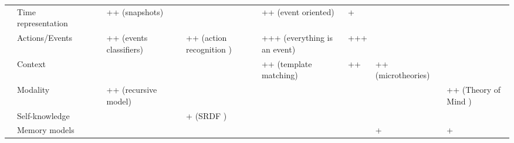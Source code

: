 \begin{landscape}
\begin{table}
\begin{center}
\begin{tabular}{p{0.2cm}p{3.4cm}p{1.6cm}p{1.3cm}p{1.7cm}p{1.5cm}p{2cm}p{2cm}p{1.4cm}p{1.8cm}|p{2cm}}
                                                               & Time representation &                           &                             & ++ (snapshots)              &                             &                                    & ++ (event oriented)                             & +                             &                               &                                               \\
                                                                    & Actions/Events &                           &                             & ++ (events classifiers)     &                             & ++ (action recognition \cite{Beetz2010a})  & +++ (everything is an event)            & +++                           &                               &                                               \\
                                                                           & Context &                           &                             &                             &                             &                                    & ++ (template matching)                          & ++                            & ++ (microtheories)            &                                               \\
                                                                          & Modality &                           &                             & ++ (recursive model)        &                             &                                    &                                                 &                               &                               & ++ (Theory of Mind \cite{Warnier2012a})       \\
                                                                    & Self-knowledge &                           &                             &                             &                             & + (SRDF \cite{Kunze2011})          &                                                 &                               &                               &                                               \\
                                                                     & Memory models &                           &                             &                             &                             &                                    &                                                 &                               & +                             & +                                             \\

\end{tabular}
\end{center}
\end{table}
\end{landscape}
